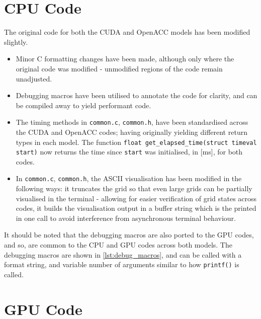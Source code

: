 \documentclass{article}
\newcommand{\lilf}[1]{\lstinline[style=ff]{#1}}
\begin{document}
\section{CPU Code}
\label{sec:cpu-code}

The original code for both the CUDA and OpenACC models has been modified
slightly.
\begin{itemize}
\item
  Minor C formatting changes have been made, although only where the original
  code was modified - unmodified regions of the code remain unadjusted.

\item
  Debugging macros have been utilised to annotate the code for clarity, and can
  be compiled away to yield performant code.

\item
  The timing methods in \lilf{common.c}, \lilf{common.h}, have been
  standardised across the CUDA and OpenACC codes; having originally yielding
  different return types in each model.
  The function \lstinline{float get_elapsed_time(struct timeval start)} now
  returns the time since \lstinline{start} was initialised, in
  [\si{\milli\second}], for both codes.

\item
  In \lilf{common.c}, \lilf{common.h}, the ASCII visualisation has been modified
  in the following ways: it truncates the grid so that even large grids can be
  partially visualised in the terminal - allowing for easier verification of
  grid states across codes, it builds the visualisation output in a buffer
  string which is the printed in one call to avoid interference from
  asynchronous terminal behaviour.

\end{itemize}

It should be noted that the debugging macros are also ported to the GPU codes,
and so, are common to the CPU and GPU codes across both models.
The debugging macros are shown in \autoref{lst:debug_macros}, and can be called
with a format string, and variable number of arguments similar to how
\lstinline{printf()} is called.



\clearpage
\section{GPU Code}
\label{sec:Gpu-code}
\end{document}
